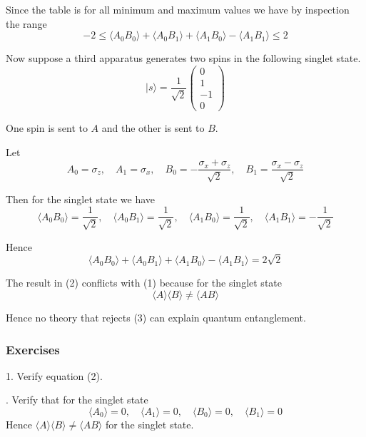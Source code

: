 Since the table is for all minimum and maximum values we have by inspection the range
\begin{equation*}
-2\le \langle A_0B_0\rangle+\langle A_0B_1\rangle+\langle A_1B_0\rangle-\langle A_1B_1\rangle\le2
\tag{1}
\end{equation*}

Now suppose a third apparatus generates two spins in the following singlet state.
\begin{equation*}
|s\rangle=\frac{1}{\sqrt2}\begin{pmatrix}0\\1\\-1\\0\end{pmatrix}
\end{equation*}

One spin is sent to $A$ and the other is sent to $B$.

\bigskip
Let
\begin{equation*}
A_0=\sigma_z,\quad
A_1=\sigma_x,\quad
B_0=-\frac{\sigma_x+\sigma_z}{\sqrt2},\quad
B_1=\frac{\sigma_x-\sigma_z}{\sqrt2}
\end{equation*}

Then for the singlet state we have
\begin{equation*}
\langle A_0B_0\rangle=\frac{1}{\sqrt2},\quad
\langle A_0B_1\rangle=\frac{1}{\sqrt2},\quad
\langle A_1B_0\rangle=\frac{1}{\sqrt2},\quad
\langle A_1B_1\rangle=-\frac{1}{\sqrt2}
\end{equation*}

Hence
\begin{equation*}
\langle A_0B_0\rangle+
\langle A_0B_1\rangle+
\langle A_1B_0\rangle-
\langle A_1B_1\rangle=2\sqrt2
\tag{2}
\end{equation*}

The result in (2) conflicts with (1) because for the singlet state
\begin{equation*}
\langle A\rangle\langle B\rangle\ne\langle AB\rangle
\tag{3}
\end{equation*}

Hence no theory that rejects (3) can explain quantum entanglement.

\subsubsection*{Exercises}

1. Verify equation (2).

. Verify that for the singlet state
\begin{equation*}
\langle A_0\rangle=0,\quad\langle A_1\rangle=0,\quad\langle B_0\rangle=0,\quad\langle B_1\rangle=0
\end{equation*}
Hence $\langle A\rangle\langle B\rangle\ne\langle AB\rangle$ for the singlet state.

